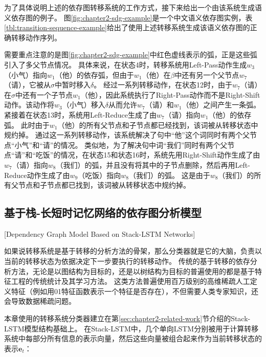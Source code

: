 为了具体说明上述的依存图转移系统的工作方式，接下来给出一个由该系统生成语义依存图的例子。
图\ref{fig:chapter2-sdg-example}是一个中文语义依存图实例，表\ref{tbl:transition-sequence-example}给出了使用上述转移系统生成该语义依存图的正确转移动作序列。

需要重点注意的是图\ref{fig:chapter2-sdg-example}中红色虚线表示的弧，正是这些弧引入了多父节点情况。
具体来说，在状态4时，转移系统用Left-Pass动作生成$w_3$（小气）指向$w_1$（他）的依存弧，但由于$w_1$（他）在$\beta$中还有另一个父节点$w_7$（请），它被从$\sigma$中暂时移入$\delta$。
经过一系列转移动作，在状态12时，由于$w_7$（请）在$\sigma$中还有一个子节点$w_1$（他），因此系统执行了Right-Pass动作而不是Right-Shift动作。该动作将$w_3$（小气）移入$\delta$从而允许$w_7$（请）和$w_1$（他）之间产生一条弧。
紧接着在状态13时，系统用Left-Reduce生成了由$w_7$（请）指向$w_1$（他）的依存弧。
此时由于$w_1$（他）的所有父节点和子节点都已经找到，该词被从转移状态中规约掉。
通过这一系列转移动作，该系统解决了句中“他”这个词同时有两个父节点“小气”和“请”的情况。
类似地，为了解决句中词“我们”同时有两个父节点“请”和“吃饭”的情况，在状态15和状态16时，系统先用Right-Shift动作生成了由$w_7$（请）指向$w_8$（我们）的弧，并且没有将其中的子节点删除，然后再用Left-Reduce动作生成了由$w_9$（吃饭）指向$w_8$（我们）的弧。
这是由于$w_8$（我们）的所有父节点和子节点都已找到，该词被从转移状态中规约掉。


\subsection{基于栈-长短时记忆网络的依存图分析模型}[Dependency Graph Model Based on Stack-LSTM Networks]

如果说转移系统是基于转移的分析方法的骨架，那么分类器就是它的大脑，负责以当前的转移状态为依据决定下一步要执行的转移动作。
传统的基于转移的依存分析方法，无论是以图结构为目标的\cite{sagae-tsujii-2008-shift,titov-etal-2009-online}，还是以树结构为目标的\cite{yamada-etal-2003-statistical,nivre-2004-incrementality}普遍使用的都是基于特征工程的传统统计及其学习方法。
这类方法普遍使用百万级别的高维稀疏人工定义特征（例如用01特征函数表示一个特征是否存在），不但需要人类专家知识，还会导致数据稀疏问题。

本章使用的转移系统分类器建立在第\ref{sec:chapter2-related-work}节介绍的Stack-LSTM模型结构基础上。
在Stack-LSTM中，几个单向LSTM分别被用于计算转移系统中每部分所有信息的表示向量，然后这些向量被组合起来作为当前转移状态的表示$\bm{e}_t$：

